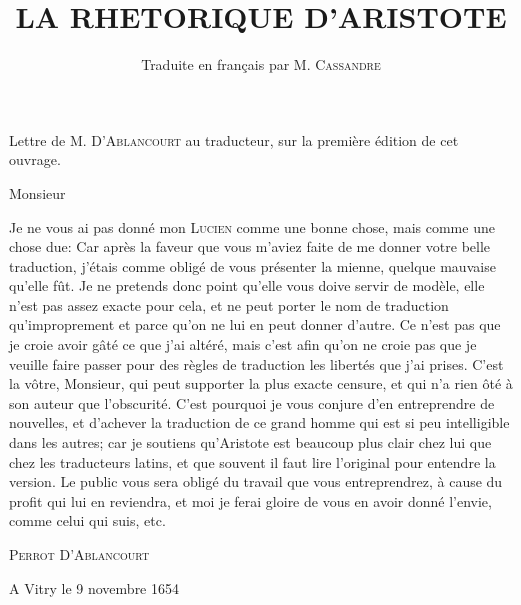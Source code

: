 \documentclass[11pt]{book}
\title{LA 
RHETORIQUE 
D'ARISTOTE}
\author{Traduite en français par M. \textsc{Cassandre}}
\begin{document}
\maketitle

Lettre de M. \textsc{D'Ablancourt} au traducteur, sur la première édition de cet ouvrage. 

Monsieur

Je ne vous ai pas donné mon \textsc{Lucien} comme une 
bonne chose, mais comme une chose due: Car après 
la faveur que vous m'aviez faite de me donner votre 
belle traduction, j'étais comme obligé de vous
présenter la mienne, quelque mauvaise qu'elle fût. Je ne 
pretends donc point qu'elle vous doive servir de modèle,
elle n'est pas assez exacte pour cela, et ne peut porter
le nom de traduction qu'improprement et parce 
qu'on ne lui en peut donner d'autre. Ce n'est pas que 
je croie avoir gâté ce que j'ai altéré, mais c'est afin 
qu'on ne croie pas que je veuille faire passer pour des 
règles de traduction les libertés que j'ai prises. C'est la 
vôtre, Monsieur, qui peut supporter la plus exacte censure, 
et qui n'a rien ôté à son auteur que l'obscurité. 
C'est pourquoi je vous conjure d'en entreprendre de 
nouvelles, et d'achever la traduction de ce grand 
homme qui est si peu intelligible dans les autres; car je 
soutiens qu'Aristote est beaucoup plus clair chez lui que 
chez les traducteurs latins, et que souvent il faut 
lire l'original pour entendre la version. Le public vous 
sera obligé du travail que vous entreprendrez, à cause 
du profit qui lui en reviendra, et moi je ferai gloire de 
vous en avoir donné l'envie, comme celui qui suis, etc.

\textsc{Perrot D'Ablancourt}

A Vitry le 9 novembre 1654

\tableofcontents



\end{document}
